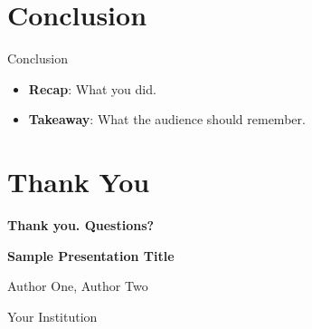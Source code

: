 \documentclass[aspectratio=169,11pt]{beamer}
\begin{document}
\section{Conclusion}
\begin{frame}{Conclusion}
  \begin{itemize}
    \item \textbf{Recap}: What you did.
    \item \textbf{Takeaway}: What the audience should remember.
  \end{itemize}
\end{frame}

\section{Thank You}
\begin{frame}
  \begin{center}
  \vspace{1.5em}
  {\LARGE \textbf{Thank you. Questions?}}
  \vspace{2em}
  \par
  \textbf{Sample Presentation Title}
  \vspace{1em}
  \par
  Author One, Author Two
  \vspace{0.5em}
  \par
  Your Institution
  \end{center}
\end{frame}
\end{document}

